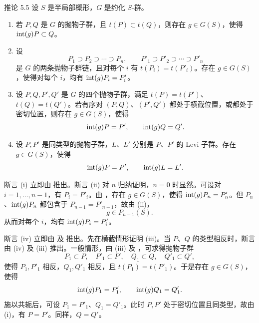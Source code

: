 \begin{sgastatement}{推论 5.5}
设 \(S\) 是半局部概形，\(G\) 是约化 \(S\)-群。
\begin{enumerate}[label=\textup{(\roman*)}]
\item 若 \(P,Q\) 是 \(G\) 的抛物子群，且 \(t(P)\subset t(Q)\)，则存在 \(g\in G(S)\)，使得 \(\operatorname{int}(g)P\subset Q\)。
\item 设
\[
 P_1\supset P_2\supset\cdots\supset P_n,\qquad
 P'_1\supset P'_2\supset\cdots\supset P'_n
\]
是 \(G\) 的两条抛物子群链，且对每个 \(i\) 有 \(t(P_i)=t(P'_i)\)。存在 \(g\in G(S)\)，使得对每个 \(i\)，均有 \(\operatorname{int}(g)P_i=P'_i\)。
\item 设 \(P,Q,P',Q'\) 是 \(G\) 的四个抛物子群，满足 \(t(P)=t(P')\)、\(t(Q)=t(Q')\)。若有序对 \((P,Q)\)、\((P',Q')\) 都处于横截位置，或都处于密切位置，则存在 \(g\in G(S)\)，使得
\[
 \operatorname{int}(g)P=P',\qquad\operatorname{int}(g)Q=Q'.
\]
\item 设 \(P,P'\) 是同类型的抛物子群，\(L\)、\(L'\) 分别是 \(P\)、\(P'\) 的 Levi 子群。存在 \(g\in G(S)\)，使得
\[
 \operatorname{int}(g)P=P',\qquad\operatorname{int}(g)L=L'.
\]
\end{enumerate}
\end{sgastatement}

\SGAProof
断言 \textup{(i)} 立即由  推出。断言 \textup{(ii)} 对 \(n\) 归纳证明，\(n=0\) 时显然。可设对 \(i=1,\ldots,n-1\)，有 \(P_i=P'_i\)。由 ，存在 \(g\in G(S)\)，使得 \(\operatorname{int}(g)P_n=P'_n\)。但 \(P_n\)、\(\operatorname{int}(g)P_n\) 都包含于 \(P_{n-1}=P'_{n-1}\)，故由 \textup{(ii)}，
\[
 g\in P_{n-1}(S).
\]
从而对每个 \(i\)，均有 \(\operatorname{int}(g)P_i=P'_i\)。

断言 \textup{(iv)} 立即由  及  推出。先在横截情形证明 \textup{(iii)}。当 \(P\)、\(Q\) 的类型相反时，断言由 \textup{(iv)} 及 \textup{(iii)} 推出。一般情形，由 \textup{(iii)} 及 ，可求得抛物子群
\[
 P_1\subset P,\quad P'_1\subset P',\quad
 Q_1\subset Q,\quad Q'_1\subset Q',
\]
使得 \(P_1,P'_1\) 相反，\(Q_1,Q'_1\) 相反，且 \(t(P_1)=t(P'_1)\)。于是存在 \(g\in G(S)\)，使得
\[
 \operatorname{int}(g)P_1=P'_1,\qquad\operatorname{int}(g)Q_1=Q'_1.
\]
施以共轭后，可设 \(P_1=P'_1\)、\(Q_1=Q'_1\)。此时 \(P,P'\) 处于密切位置且同类型，故由 \textup{(i)}，有 \(P=P'\)。同样，\(Q=Q'\)。

